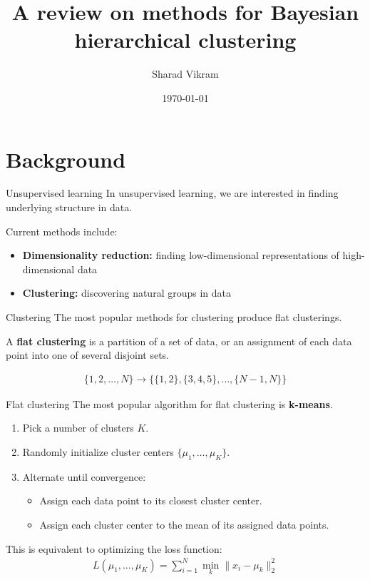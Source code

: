 \documentclass[10pt, compress]{beamer}
\title{A review on methods for Bayesian hierarchical clustering}
\subtitle{}
\date{\today}
\author{Sharad Vikram}
\institute{UCSD}
\begin{document}
\maketitle

\section{Background}

\begin{frame}{Unsupervised learning}
  In unsupervised learning, we are interested in finding
        underlying structure
        in data.

  Current methods include:
  \begin{itemize}
    \item<2-> \textbf{Dimensionality reduction:} finding low-dimensional
      representations of high-dimensional data
    \item<3-> \textbf{Clustering:} discovering natural groups
      in data
  \end{itemize}
\end{frame}

\begin{frame}{Clustering}
  The most popular methods for clustering produce
  flat clusterings.

  A \textbf{flat clustering} is a partition of a set of data,
  or an assignment of each data point into one of
  several disjoint sets.

  \begin{align}
    \{1, 2, \ldots, N\} \rightarrow \{\{1,2\}, \{3, 4, 5\}, \ldots, \{N - 1, N\}\}
  \end{align}
\end{frame}

\begin{frame}{Flat clustering}
  The most popular algorithm for flat clustering is \textbf{k-means}.
  \begin{enumerate}
    \item<2-> Pick a number of clusters $K$.
    \item<3-> Randomly initialize cluster centers $\{\mu_1, \ldots, \mu_K\}$.
    \item<4-> Alternate until convergence:
      \begin{itemize}
        \item Assign each data point to its closest cluster center.
        \item Assign each cluster center to the mean of its assigned data points.
      \end{itemize}
  \end{enumerate}
  This is equivalent to optimizing the loss function:
  \begin{align}
    L(\mu_1, \ldots, \mu_K) = \sum_{i = 1}^N \min_k \|x_i - \mu_k\|^2_2
  \end{align}
\end{frame}
\end{document}

